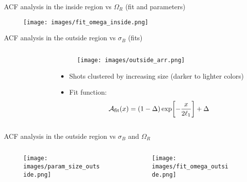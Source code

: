 \documentclass[aspectratio=169]{beamer}
\begin{document}
\begin{frame}{ACF analysis in the inside region vs $\Omega_R$ (fit and parameters)}
  \begin{figure}
      \centering
      \texttt{[image: images/fit\_omega\_inside.png]}
  \end{figure}
\end{frame}

\begin{frame}{ACF analysis in the outside region vs $\sigma_B$ (fits)}
  \begin{columns}
    \begin{column}{0.55\textwidth}
      \begin{figure}
        \centering
      \end{figure}
    \end{column}
    \begin{column}{0.45\textwidth}
      \begin{figure}
        \centering
        \texttt{[image: images/outside\_arr.png]}
      \end{figure}
      \begin{itemize}
        \item Shots clustered by increasing size (darker to lighter colors)
        \item Fit function:
        \[
          \mathcal{A}_{\rm fit}(x) = (1-\Delta)\exp[-\frac{x}{2\ell_1}] + \Delta
        \]
      \end{itemize}
    \end{column}
  \end{columns}
\end{frame}

\begin{frame}{ACF analysis in the outside region vs $\sigma_B$ and $\Omega_R$}
  \begin{columns}
    \begin{column}{0.5\textwidth}
      \begin{figure}
        \centering
        \texttt{[image: images/param\_size\_outside.png]}
      \end{figure}
    \end{column}
    \begin{column}{0.5\textwidth}
      \begin{figure}
        \centering
        \texttt{[image: images/fit\_omega\_outside.png]}
      \end{figure}
    \end{column}
  \end{columns}
\end{frame}
\end{document}
